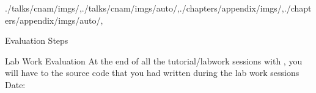 \begin{graphicspathcontext}{{./talks/cnam/imgs/},{./talks/cnam/imgs/auto/},{./chapters/appendix/imgs/},{./chapters/appendix/imgs/auto/},\old}

\begin{frame}{Evaluation Steps}
	\begin{block}{Lab Work Evaluation}
		At the end of all the tutorial/labwork sessions with , you will have to  the source code that you had written during the lab work sessions \\
		Date:  \\
	\end{block}
\end{frame}



\end{graphicspathcontext}

\endinput
